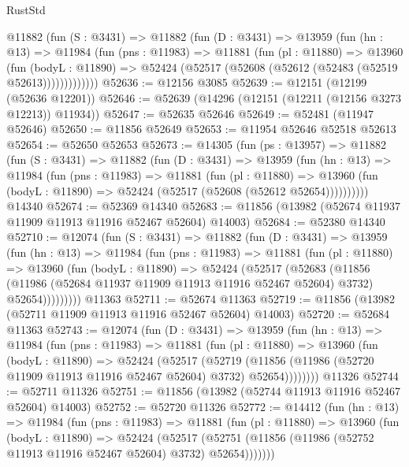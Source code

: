 \begin{lexlean}{RustStd}
\begin{coremodule}
      @11882
        (fun (S : @3431) =>
        @11882
          (fun (D : @3431) =>
          @13959
            (fun (hn : @13) =>
            @11984
              (fun (pns : @11983) =>
              @11881
                (fun (pl : @11880) =>
                @13960
                  (fun (bodyL : @11890) =>
                  @52424 (@52517 (@52608 (@52612 (@52483 (@52519 @52613)))))))))))))
@52636 := @12156 @3085
@52639 := @12151 (@12199 (@52636 @12201))
@52646 := @52639 (@14296 (@12151 (@12211 (@12156 @3273 @12213)) @11934))
@52647 := @52635 @52646
@52649 := @52481 (@11947 @52646)
@52650 := @11856 @52649
@52653 := @11954 @52646 @52518 @52613
@52654 := @52650 @52653
@52673 := @14305
    (fun (ps : @13957) =>
    @11882
      (fun (S : @3431) =>
      @11882
        (fun (D : @3431) =>
        @13959
          (fun (hn : @13) =>
          @11984
            (fun (pns : @11983) =>
            @11881
              (fun (pl : @11880) =>
              @13960 (fun (bodyL : @11890) => @52424 (@52517 (@52608 (@52612 @52654))))))))))
    @14340
@52674 := @52369 @14340
@52683 := @11856 (@13982 (@52674 @11937 @11909 @11913 @11916 @52467 @52604) @14003)
@52684 := @52380 @14340
@52710 := @12074
    (fun (S : @3431) =>
    @11882
      (fun (D : @3431) =>
      @13959
        (fun (hn : @13) =>
        @11984
          (fun (pns : @11983) =>
          @11881
            (fun (pl : @11880) =>
            @13960
              (fun (bodyL : @11890) =>
              @52424
                (@52517
                  (@52683
                    (@11856
                      (@11986 (@52684 @11937 @11909 @11913 @11916 @52467 @52604) @3732)
                      @52654)))))))))
    @11363
@52711 := @52674 @11363
@52719 := @11856 (@13982 (@52711 @11909 @11913 @11916 @52467 @52604) @14003)
@52720 := @52684 @11363
@52743 := @12074
    (fun (D : @3431) =>
    @13959
      (fun (hn : @13) =>
      @11984
        (fun (pns : @11983) =>
        @11881
          (fun (pl : @11880) =>
          @13960
            (fun (bodyL : @11890) =>
            @52424
              (@52517
                (@52719
                  (@11856 (@11986 (@52720 @11909 @11913 @11916 @52467 @52604) @3732) @52654))))))))
    @11326
@52744 := @52711 @11326
@52751 := @11856 (@13982 (@52744 @11913 @11916 @52467 @52604) @14003)
@52752 := @52720 @11326
@52772 := @14412
    (fun (hn : @13) =>
    @11984
      (fun (pns : @11983) =>
      @11881
        (fun (pl : @11880) =>
        @13960
          (fun (bodyL : @11890) =>
          @52424
            (@52517
              (@52751 (@11856 (@11986 (@52752 @11913 @11916 @52467 @52604) @3732) @52654)))))))

\end{coremodule}
\end{lexlean}

